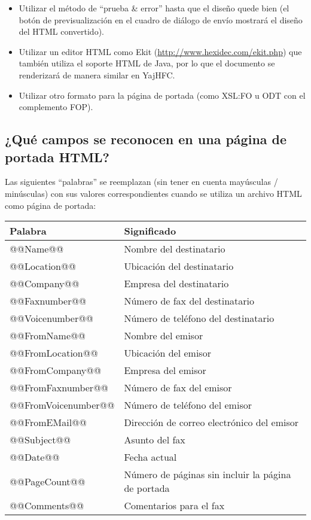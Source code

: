 \documentclass[a4paper,10pt]{scrartcl}
\begin{document}
\begin{itemize}
 \item Utilizar el método de ``prueba \& error'' hasta que el diseño quede bien (el botón de previsualización en el cuadro de diálogo de envío mostrará el diseño del HTML convertido).
 \item Utilizar un editor HTML como Ekit (\url{http://www.hexidec.com/ekit.php}) que también utiliza el soporte HTML de Java, por lo que el documento se renderizará de manera similar en YajHFC.
 \item Utilizar otro formato para la página de portada (como XSL:FO u ODT con el complemento FOP).
\end{itemize}

\subsection{¿Qué campos se reconocen en una página de portada HTML?}

Las siguientes ``palabras'' se reemplazan (sin tener en cuenta mayúsculas / minúsculas) con sus valores correspondientes cuando se utiliza un archivo HTML como página de portada:

\begin{center}
\begin{tabular}{|l|l|}
\hline
\bfseries Palabra & \bfseries Significado \\
\hline\hline
\ttfamily @@Name@@ & Nombre del destinatario \\\hline
\ttfamily @@Location@@ & Ubicación del destinatario \\\hline
\ttfamily @@Company@@ & Empresa del destinatario \\\hline
\ttfamily @@Faxnumber@@ & Número de fax del destinatario \\\hline
\ttfamily @@Voicenumber@@ & Número de teléfono del destinatario \\\hline
\ttfamily @@FromName@@ & Nombre del emisor \\\hline
\ttfamily @@FromLocation@@ & Ubicación del emisor \\\hline
\ttfamily @@FromCompany@@ & Empresa del emisor \\\hline
\ttfamily @@FromFaxnumber@@ & Número de fax del emisor \\\hline
\ttfamily @@FromVoicenumber@@ & Número de teléfono del emisor \\\hline
\ttfamily @@FromEMail@@ & Dirección de correo electrónico del emisor \\\hline
\ttfamily @@Subject@@ & Asunto del fax \\\hline
\ttfamily @@Date@@ & Fecha actual \\\hline
\ttfamily @@PageCount@@ & Número de páginas sin incluir la página de portada \\\hline
\ttfamily @@Comments@@ & Comentarios para el fax \\\hline
\end{tabular}
\end{center}
\end{document}
